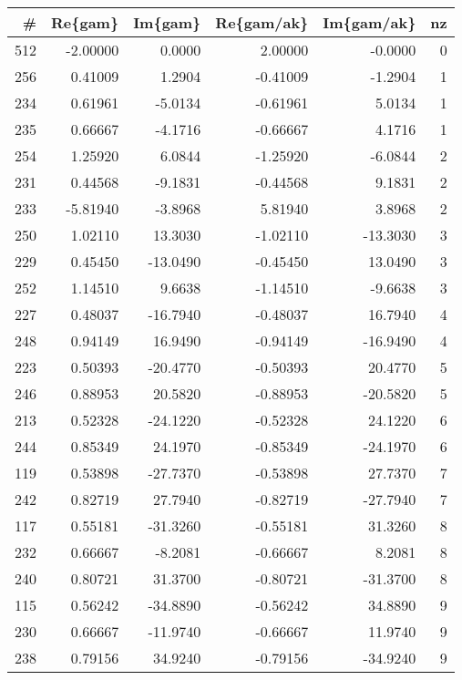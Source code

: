 \small \begin{tabular}{rrrrrr}
\toprule
  \# &  Re\{gam\} &  Im\{gam\} &  Re\{gam/ak\} &  Im\{gam/ak\} &  nz \\
\midrule
512 & -2.00000 &   0.0000 &     2.00000 &     -0.0000 &   0 \\
256 &  0.41009 &   1.2904 &    -0.41009 &     -1.2904 &   1 \\
234 &  0.61961 &  -5.0134 &    -0.61961 &      5.0134 &   1 \\
235 &  0.66667 &  -4.1716 &    -0.66667 &      4.1716 &   1 \\
254 &  1.25920 &   6.0844 &    -1.25920 &     -6.0844 &   2 \\
231 &  0.44568 &  -9.1831 &    -0.44568 &      9.1831 &   2 \\
233 & -5.81940 &  -3.8968 &     5.81940 &      3.8968 &   2 \\
250 &  1.02110 &  13.3030 &    -1.02110 &    -13.3030 &   3 \\
229 &  0.45450 & -13.0490 &    -0.45450 &     13.0490 &   3 \\
252 &  1.14510 &   9.6638 &    -1.14510 &     -9.6638 &   3 \\
227 &  0.48037 & -16.7940 &    -0.48037 &     16.7940 &   4 \\
248 &  0.94149 &  16.9490 &    -0.94149 &    -16.9490 &   4 \\
223 &  0.50393 & -20.4770 &    -0.50393 &     20.4770 &   5 \\
246 &  0.88953 &  20.5820 &    -0.88953 &    -20.5820 &   5 \\
213 &  0.52328 & -24.1220 &    -0.52328 &     24.1220 &   6 \\
244 &  0.85349 &  24.1970 &    -0.85349 &    -24.1970 &   6 \\
119 &  0.53898 & -27.7370 &    -0.53898 &     27.7370 &   7 \\
242 &  0.82719 &  27.7940 &    -0.82719 &    -27.7940 &   7 \\
117 &  0.55181 & -31.3260 &    -0.55181 &     31.3260 &   8 \\
232 &  0.66667 &  -8.2081 &    -0.66667 &      8.2081 &   8 \\
240 &  0.80721 &  31.3700 &    -0.80721 &    -31.3700 &   8 \\
115 &  0.56242 & -34.8890 &    -0.56242 &     34.8890 &   9 \\
230 &  0.66667 & -11.9740 &    -0.66667 &     11.9740 &   9 \\
238 &  0.79156 &  34.9240 &    -0.79156 &    -34.9240 &   9 \\

\end{tabular}
